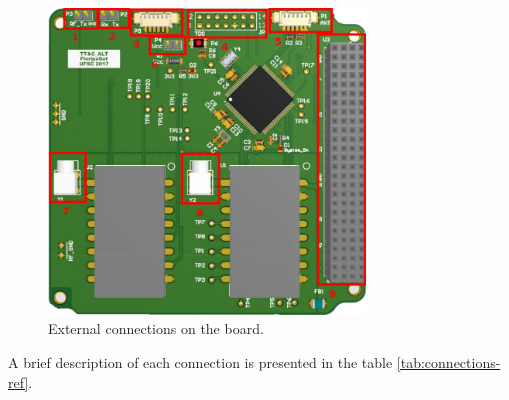 \begin{figure}[!h]
	\begin{center}
		\includegraphics[width=0.75\textwidth]{figures/ttc_board_pins}
		\caption{External connections on the board.}
		\label{fig:connections-ref}
	\end{center}
\end{figure}

A brief description of each connection is presented in the table \ref{tab:connections-ref}.

